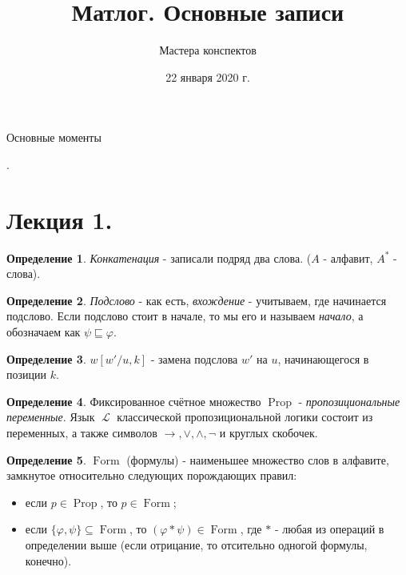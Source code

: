 \documentclass[a4paper,100pt]{article}
\title{Матлог. Основные записи}
\author{Мастера конспектов}
\date{22 января 2020 г.}
\theoremstyle{indented}
\theoremstyle{definition}
\newtheorem{defn}{Определение}
\theoremstyle{remark}
\DeclareMathOperator{\Prop}{Prop}
\DeclareMathOperator{\LL}{\mathscr{L}}
\DeclareMathOperator{\form}{Form}
\begin{document}
\newcommand{\resetexlcounters}{%
  \setcounter{exl}{0}%
} 

\newcommand{\resetremarkcounters}{%
  \setcounter{remark}{0}%
} 

\newcommand{\reseconscounters}{%
  \setcounter{cons}{0}%
} 

\newcommand{\resetall}{%
    \resetexlcounters
    \resetremarkcounters
    \reseconscounters%
}

\maketitle 

\newpage

\hypertarget{t1}{Основные моменты}. 
\tableofcontents

\newpage

\section{Лекция 1.}

\begin{defn}
  \textit{Конкатенация} - записали подряд два слова. ($A$ - алфавит, $A^*$ - слова).
\end{defn}

\begin{defn}
  \textit{Подслово} - как есть, \textit{вхождение} - учитываем, где начинается подслово. Если подслово стоит в начале, то мы его и называем \textit{начало}, а обозначаем как $\psi \sqsubseteq \varphi$.
\end{defn}

\begin{defn}
  $w[w'/u, k]$ - замена подслова $w'$ на $u$, начинающегося в позиции $k$.
\end{defn}

\begin{defn}
  Фиксированное счётное множество $\Prop$ - \textit{пропозициональные переменные}. Язык $\LL$ классической пропозициональной логики состоит из переменных, а также символов $\rightarrow, \vee, \wedge, \neg$ и круглых скобочек.
\end{defn}

\begin{defn}
  $\form$ (формулы) - наименьшее множество слов в алфавите, замкнутое относительно следующих порождающих правил:
  \begin{itemize}
    \item если $p\in \Prop$, то $p\in \form$; 
    \item если $\{\varphi, \psi\}\subseteq \form$, то $(\varphi*\psi)\in \form$, где $*$ - любая из операций в определении выше (если отрицание, то отсительно одногой формулы, конечно).
  \end{itemize}
\end{defn}
\end{document}
